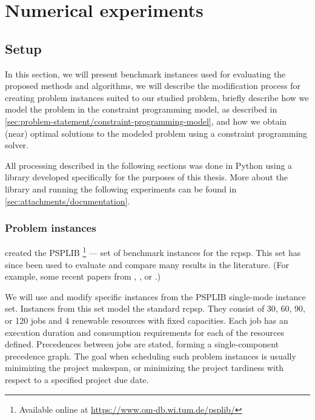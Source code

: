 \chapter{Numerical experiments} \label{chap:numerical-experiments}

\section{Setup} \label{sec:numerical-experiments/setup}

In this section, we will present benchmark instances used for evaluating the proposed methods and algorithms,
we will describe the modification process for creating problem instances suited to our studied problem,
briefly describe how we model the problem in the constraint programming model,
as described in \cref{sec:problem-statement/constraint-programming-model},
and how we obtain (near) optimal solutions to the modeled problem using a constraint programming solver.

All processing described in the following sections was done in Python using a library
developed specifically for the purposes of this thesis.
More about the library and running the following experiments can be found in \cref{sec:attachments/documentation}.

\subsection{Problem instances} \label{subsec:numerical-experiments/setup/instances}

\citet{Kolisch1997} created the PSPLIB%
\footnote{Available online at \url{https://www.om-db.wi.tum.de/psplib/}}
--- set of benchmark instances for the \ac{rcpsp}.
This set has since been used to evaluate and compare many results in the literature.
(For example, some recent papers from \citet{Bianco2011}, \citet{Cheng2015}, or \citet{Elsayed2017}.)

We will use and modify specific instances from the PSPLIB single-mode instance set.
Instances from this set model the standard \ac{rcpsp}.
They consist of 30, 60, 90, or 120 jobs
and 4 renewable resources with fixed capacities.
Each job has an execution duration and consumption requirements for each of the resources defined.
Precedences between jobs are stated, forming a single-component precedence graph.
The goal when scheduling such problem instances is usually minimizing the project makespan,
or minimizing the project tardiness with respect to a specified project due date.

